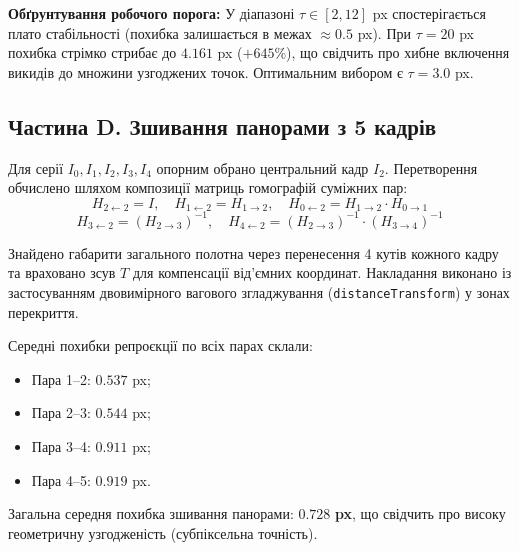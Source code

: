 \documentclass[12pt, a4paper]{article}
\begin{document}
	\textbf{Обґрунтування робочого порога:} У діапазоні $\tau \in [2, 12]$ px спостерігається плато стабільності (похибка залишається в межах $\approx 0.5$ px). При $\tau = 20$ px похибка стрімко стрибає до $4.161$ px ($+645\%$), що свідчить про хибне включення викидів до множини узгоджених точок. Оптимальним вибором є $\tau = 3.0$ px.
	
	\begin{figure}[ht]
		\centering
	\end{figure}
	
	\begin{figure}[ht]
		\centering
	\end{figure}
	
	\subsection{Частина D. Зшивання панорами з 5 кадрів}
	Для серії $I_0, I_1, I_2, I_3, I_4$ опорним обрано центральний кадр $I_2$. Перетворення обчислено шляхом композиції матриць гомографій суміжних пар:
	\begin{equation}
		H_{2 \leftarrow 2} = I, \quad H_{1 \leftarrow 2} = H_{1 \to 2}, \quad H_{0 \leftarrow 2} = H_{1 \to 2} \cdot H_{0 \to 1}
	\end{equation}
	\begin{equation}
		H_{3 \leftarrow 2} = (H_{2 \to 3})^{-1}, \quad H_{4 \leftarrow 2} = (H_{2 \to 3})^{-1} \cdot (H_{3 \to 4})^{-1}
	\end{equation}
	
	Знайдено габарити загального полотна через перенесення 4 кутів кожного кадру та враховано зсув $T$ для компенсації від'ємних координат. Накладання виконано із застосуванням двовимірного вагового згладжування (\texttt{distanceTransform}) у зонах перекриття.
	
	Середні похибки репроєкції по всіх парах склали:
	\begin{itemize}
		\item Пара 1--2: $0.537$ px;
		\item Пара 2--3: $0.544$ px;
		\item Пара 3--4: $0.911$ px;
		\item Пара 4--5: $0.919$ px.
	\end{itemize}
	Загальна середня похибка зшивання панорами: $\mathbf{0.728}$ \textbf{px}, що свідчить про високу геометричну узгодженість (субпіксельна точність).
	
\end{document}
